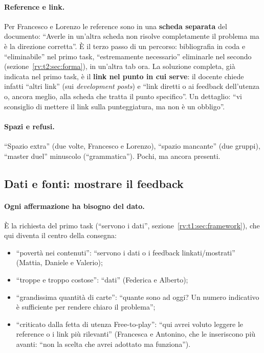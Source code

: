 \paragraph{Reference e link.} Per Francesco e Lorenzo le reference sono in una
\textbf{scheda separata} del documento: ``Averle in un'altra scheda non risolve
completamente il problema ma è la direzione corretta''. È il terzo passo di
un percorso: bibliografia in coda e ``eliminabile'' nel primo task,
``estremamente necessario'' eliminarle nel secondo
(sezione~\ref{rv:t2:sec:forma}), in un'altra tab ora. La soluzione completa,
già indicata nel primo task, è il \textbf{link nel punto in cui serve}: il
docente chiede infatti ``altri link'' (sui \emph{development posts}) e ``link
diretti o ai feedback dell'utenza o, ancora meglio, alla scheda che tratta il
punto specifico''. Un dettaglio: ``vi sconsiglio di mettere il link sulla
punteggiatura, ma non è un obbligo''.

\paragraph{Spazi e refusi.} ``Spazio extra'' (due volte, Francesco e
Lorenzo), ``spazio mancante'' (due gruppi), ``master duel'' minuscolo
(``grammatica''). Pochi, ma ancora presenti.

\subsection{Dati e fonti: mostrare il feedback}
\label{rv:t3:sec:dati}

\paragraph{Ogni affermazione ha bisogno del dato.} È la richiesta del primo
task (``servono i dati'', sezione~\ref{rv:t1:sec:framework}), che qui diventa
il centro della consegna:
\begin{itemize}
  \item ``povertà nei contenuti'': ``servono i dati o i feedback
        linkati/mostrati'' (Mattia, Daniele e Valerio);
  \item ``troppe e troppo costose'': ``dati'' (Federica e Alberto);
  \item ``grandissima quantità di carte'': ``quante sono ad oggi? Un numero
        indicativo è sufficiente per rendere chiaro il problema'';
  \item ``criticato dalla fetta di utenza Free-to-play'': ``qui avrei voluto
        leggere le reference o i link più rilevanti'' (Francesca e Antonino,
        che le inseriscono più avanti: ``non la scelta che avrei adottato ma
        funziona'').
\end{itemize}

